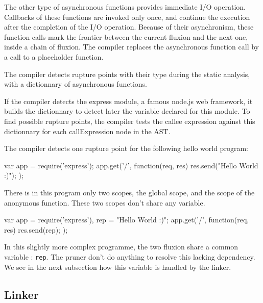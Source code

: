 The other type of asynchronous functions provides immediate I/O operation.
Callbacks of these functions are invoked only once, and continue the execution after the completion of the I/O operation.
Because of their asynchronism, these function calls mark the frontier between the current fluxion and the next one, inside a chain of fluxion.
The compiler replaces the asynchronous function call by a call to a placeholder function.


The compiler detects rupture points with their type during the static analysis, with a dictionnary of asynchronous functions.

If the compiler detects the express module, a famous node.js web framework, it builds the dictionnary to detect later the variable declared for this module.
To find possible rupture points, the compiler tests the callee expression against this dictionnary for each callExpression node in the AST.

The compiler detects one rupture point for the following hello world program: 

\begin{code}[Javascript, caption={Hello World},label={lst:astnode}]
var app = require('express');
app.get('/', function(req, res) {
  res.send("Hello World :)");
});
\end{code}


There is in this program only two scopes, the global scope, and the scope of the anonymous function.
These two scopes don't share any variable.


\begin{code}[Javascript, caption={Counter},label={lst:astnode}]
var app = require('express'),
    rep = "Hello World :)";
app.get('/', function(req, res) {
  res.send(rep);
});
\end{code}

In this slightly more complex programme, the two fluxion share a common variable : \texttt{rep}.
The pruner don't do anything to resolve this lacking dependency.
We see in the next subsection how this variable is handled by the linker.

\subsection{Linker} \label{ss:linker}


